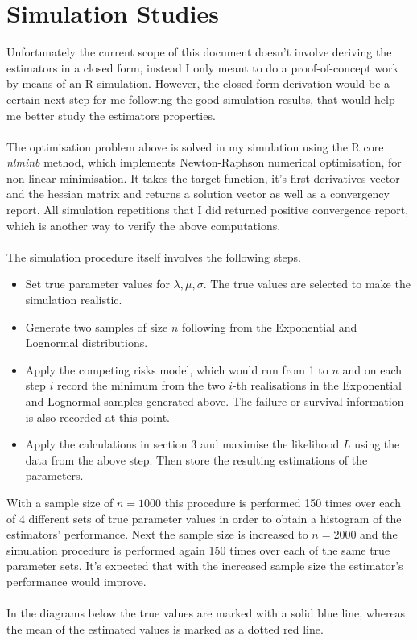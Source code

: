 \documentclass{article}
\begin{document}
\section{Simulation Studies}
\indent \indent Unfortunately the current scope of this document doesn't involve deriving the estimators in a closed form, instead I only meant to do a proof-of-concept work by means of an R simulation. However, the closed form derivation would be a certain next step for me following the good simulation results, that would help me better study the estimators properties. 
\\
\\
\indent The optimisation problem above is solved in my simulation using the R core \textit{nlminb} method, which implements Newton-Raphson numerical optimisation, for non-linear minimisation. It takes the target function, it's first derivatives vector and the hessian matrix and returns a solution vector as well as a convergency report. All simulation repetitions that I did returned positive convergence report, which is another way to verify the above computations.
\\
\\
\indent The simulation procedure itself involves the following steps.
\begin{itemize}
\item Set true parameter values for $\lambda, \mu, \sigma$. The true values are selected to make the simulation realistic. 
\item Generate two samples of size $n$ following from the Exponential and Lognormal distributions.
\item Apply the competing risks model, which would run from 1 to $n$ and on each step $i$ record the minimum from the two $i$-th realisations in the Exponential and Lognormal samples generated above. The failure or survival information is also recorded at this point.
\item Apply the calculations in section 3 and maximise the likelihood $L$ using the data from the above step. Then store the resulting estimations of the parameters.
\end{itemize}
\indent With a sample size of $n = 1000$ this procedure is performed 150 times over each of 4 different sets of true parameter values in order to obtain a histogram of the estimators' performance. Next the sample size is increased to $n = 2000$ and the simulation procedure is performed again 150 times over each of the same true parameter sets. It's expected that with the increased sample size the estimator's performance would improve.
\\
\\
\indent In the diagrams below the true values are marked with a solid blue line, whereas the mean of the estimated values is marked as a dotted red line. 
\end{document}
